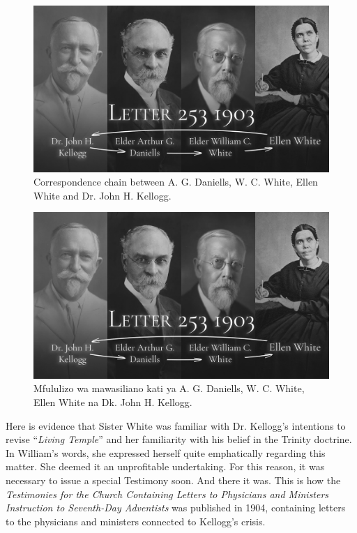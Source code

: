 \begin{figure}[h]
    \centering
    \includegraphics[width=1\linewidth]{images/correspondance.jpg}
    \caption*{Correspondence chain between A. G. Daniells, W. C. White, Ellen White and Dr. John H. Kellogg.}
    \label{fig:corespondance}
\end{figure}


\begin{figure}[h]
    \centering
    \includegraphics[width=1\linewidth]{images/correspondance.jpg}
    \caption*{Mfululizo wa mawasiliano kati ya A. G. Daniells, W. C. White, Ellen White na Dk. John H. Kellogg.}
    \label{fig:corespondance}
\end{figure}


Here is evidence that Sister White was familiar with Dr. Kellogg's intentions to revise “\textit{Living Temple}” and her familiarity with his belief in the Trinity doctrine. In William's words, she expressed herself quite emphatically regarding this matter. She deemed it an unprofitable undertaking. For this reason, it was necessary to issue a special Testimony soon. And there it was. This is how the \textit{Testimonies for the Church Containing Letters to Physicians and Ministers Instruction to Seventh-Day Adventists} was published in 1904, containing letters to the physicians and ministers connected to Kellogg's crisis.


